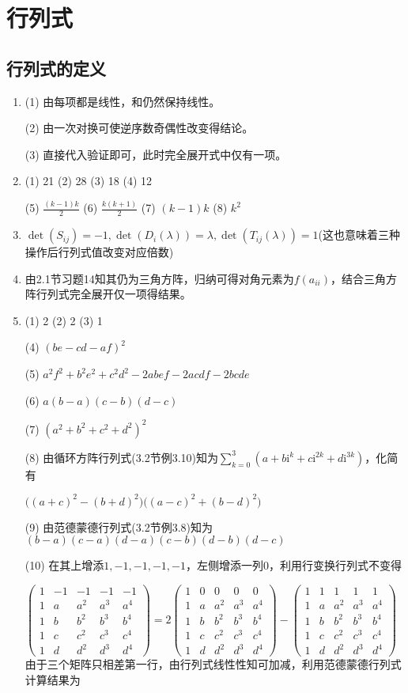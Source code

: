 \documentclass[a4paper,UTF8,fontset=windows]{ctexart}
\begin{document}
\section{行列式}
\subsection{行列式的定义}
\begin{enumerate}
\item
(1) 由每项都是线性，和仍然保持线性。

(2) 由一次对换可使逆序数奇偶性改变得结论。

(3) 直接代入验证即可，此时完全展开式中仅有一项。

\item
(1) 21 (2) 28 (3) 18 (4) 12

(5) $\frac{(k-1)k}{2}$ (6) $\frac{k(k+1)}{2}$ (7) $(k-1)k$ (8) $k^2$

\item
$\det(S_{ij})=-1,\det(D_i(\lambda))=\lambda,\det(T_{ij}(\lambda))=1$(这也意味着三种操作后行列式值改变对应倍数)

\item
由2.1节习题14知其仍为三角方阵，归纳可得对角元素为$f(a_{ii})$，结合三角方阵行列式完全展开仅一项得结果。

\item
(1) 2 (2) 2 (3) 1

(4) $(be-cd-af)^2$

(5) $a^2f^2+b^2e^2+c^2d^2-2abef-2acdf-2bcde$

(6) $a(b-a)(c-b)(d-c)$

(7) $(a^2+b^2+c^2+d^2)^2$

(8) 由循环方阵行列式(3.2节例3.10)知为$\sum_{k=0}^{3}(a+b\mathrm{i}^k+c\mathrm{i}^{2k}+d\mathrm{i}^{3k})$，化简有

$\big((a+c)^2-(b+d)^2\big)\big((a-c)^2+(b-d)^2\big)$

(9) 由范德蒙德行列式(3.2节例3.8)知为$(b-a)(c-a)(d-a)(c-b)(d-b)(d-c)$

(10) 在其上增添$1,-1,-1,-1,-1$，左侧增添一列0，利用行变换行列式不变得

$\begin{pmatrix}1&-1&-1&-1&-1\\1&a&a^2&a^3&a^4\\1&b&b^2&b^3&b^4\\1&c&c^2&c^3&c^4\\1&d&d^2&d^3&d^4\end{pmatrix}= 2\begin{pmatrix}1&0&0&0&0\\1&a&a^2&a^3&a^4\\1&b&b^2&b^3&b^4\\1&c&c^2&c^3&c^4\\1&d&d^2&d^3&d^4\end{pmatrix}-\begin{pmatrix}1&1&1&1&1\\1&a&a^2&a^3&a^4\\1&b&b^2&b^3&b^4\\1&c&c^2&c^3&c^4\\1&d&d^2&d^3&d^4\end{pmatrix}$
由于三个矩阵只相差第一行，由行列式线性性知可加减，利用范德蒙德行列式计算结果为


\end{enumerate}
\end{document}
